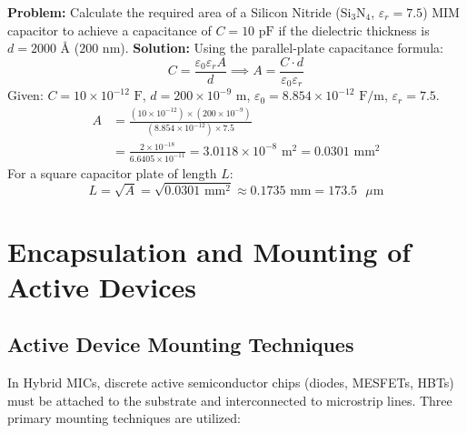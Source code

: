 \documentclass[10pt,a4paper]{article}
\begin{document}
\begin{tcolorbox}[examplebox, title={MIM Capacitor Calculation}]
  \textbf{Problem:} Calculate the required area of a Silicon Nitride ($\text{Si}_3\text{N}_4$, $\varepsilon_r = 7.5$) MIM capacitor to achieve a capacitance of $C = 10\text{ pF}$ if the dielectric thickness is $d = 2000\text{ \AA}$ ($200\text{ nm}$).
  \tcblower
  \textbf{Solution:}
  Using the parallel-plate capacitance formula:
  \begin{equation}
    C = \frac{\varepsilon_0 \varepsilon_r A}{d} \implies A = \frac{C \cdot d}{\varepsilon_0 \varepsilon_r}
  \end{equation}
  Given: $C = 10 \times 10^{-12}\text{ F}$, $d = 200 \times 10^{-9}\text{ m}$, $\varepsilon_0 = 8.854 \times 10^{-12}\text{ F/m}$, $\varepsilon_r = 7.5$.
  \begin{equation}
    \begin{aligned}
      A &= \frac{(10 \times 10^{-12}) \times (200 \times 10^{-9})}{(8.854 \times 10^{-12}) \times 7.5} \\
      &= \frac{2 \times 10^{-18}}{6.6405 \times 10^{-11}} = 3.0118 \times 10^{-8}\text{ m}^2 = 0.0301\text{ mm}^2
    \end{aligned}
  \end{equation}
  For a square capacitor plate of length $L$:
  \begin{equation}
    L = \sqrt{A} = \sqrt{0.0301\text{ mm}^2} \approx 0.1735\text{ mm} = 173.5\text{ }\mu\text{m}
  \end{equation}
\end{tcolorbox}

\section{Encapsulation and Mounting of Active Devices}

\subsection{Active Device Mounting Techniques}
In Hybrid MICs, discrete active semiconductor chips (diodes, MESFETs, HBTs) must be attached to the substrate and interconnected to microstrip lines. Three primary mounting techniques are utilized:
\end{document}
